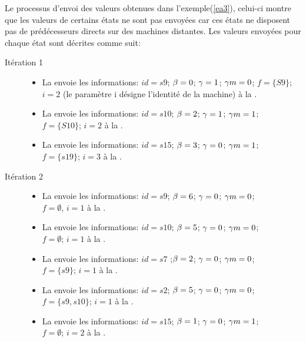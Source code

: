 \begin{Exemple}\label{ea4}
	Le processus d'envoi des valeurs obtenues dans l'exemple(\ref{ea3}), celui-ci montre que les valeurs de certains états ne sont pas envoyées car ces états ne disposent pas de prédécesseurs directs sur des machines distantes.  Les valeurs envoyées pour chaque état sont décrites comme suit:
	\begin{description}
	\item[Itération 1]
		\begin{itemize}
		\item La \mtwo{} envoie les informations: $id =s9$; $\beta{}=0$; $\gamma{}=1$; $\gamma m{}=0$; $f =\{S9\}$; $i=2$ (le paramètre i désigne l'identité de la machine) à la \mone{}.
		\item La \mtwo{} envoie les informations: $id =s10$; $\beta{}=2$; $\gamma{}=1$; $\gamma m{}=1$;\\$f =\{S10\}$; $i=2$  à la \mone{}.
		\item La \mtree{} envoie les informations: $id =s15$; $\beta{}=3$; $\gamma{}=0$; $\gamma m{}=1$;\\$f =\{s19\}$; $i=3$	 à la \mtwo{}.
		\end{itemize}
	\item[Itération 2]
		\begin{itemize}
			\item La \mone{} envoie les informations: $id =s9$; $\beta{} =6$; $\gamma{} =0$; $\gamma m{}=0$;\\$f =\emptyset$, $i=1$ à la \mtwo{}.
			\item  La \mone{} envoie les informations: $id =s10$; $\beta{}=5$; $\gamma{}=0$; $\gamma m{}=0$;\\$f =\emptyset$; $i=1$ à la \mtwo{}.
			\item  La \mone{} envoie les informations: $id =s7$ ;$\beta{}=2$; $\gamma{}=0$; $\gamma m{}=0$;\\$f =\{s9\}$; $i=1$ à la \mtwo{}.
			\item  La \mone{} envoie les informations: $id =s2$; $\beta{}=5$; $\gamma{}=0$; $\gamma m{}=0$;\\$f =\{s9,s10\}$; $i=1$ à la \mtree{}.
			\item  La \mtwo{} envoie les informations: $id =s15$; $\beta{}=1$; $\gamma{}=0$; $\gamma m{}=1$;\\$f =\emptyset$; $i=2$ à la \mtree{}.

\end{itemize}
\end{description}
\end{Exemple}
